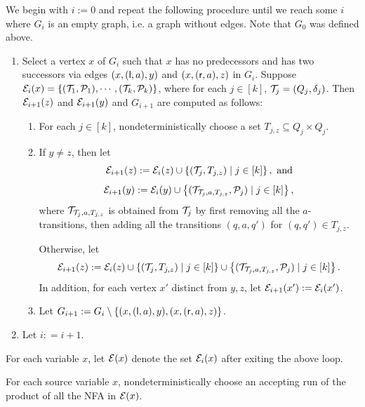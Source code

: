 We begin with $i:= 0$ and repeat the following procedure until we reach some $i$ where $G_i$ is an empty graph, i.e. a graph without edges.
Note that $G_0$ was defined above.
\begin{enumerate}
\item Select a vertex $x$ of $G_i$ such that $x$ has no predecessors  and has two successors via edges $(x, (\mathsf{l}, a), y)$ and $(x, (\mathsf{r},a), z)$ in $G_i$.  Suppose $\mathcal{E}_i(x)=\{(\mathcal{T}_1,\mathcal{P}_1), \cdots, (\mathcal{T}_k, \mathcal{P}_k)\}$, where for each $j \in [k]$, $\mathcal{T}_j = (Q_j, \delta_j)$. Then $\mathcal{E}_{i+1}(z)$ and  $\mathcal{E}_{i+1}(y)$ and $G_{i+1}$ are computed as follows:
\begin{enumerate}
\item For each $j \in [k]$, nondeterministically choose a set $T_{j, z} \subseteq Q_j \times Q_j$.
%
\item If $y \neq z$, then let
$$\mathcal{E}_{i+1}(z):= \mathcal{E}_{i}(z) \cup \left\{(\mathcal{T}_j, T_{j,z}) \mid j \in [k] \right\}, \text{ and}$$
$$\mathcal{E}_{i+1}(y): = \mathcal{E}_{i}(y) \cup \left\{(\mathcal{T}_{\mathcal{T}_j, a, T_{j,z}}, \mathcal{P}_j) \mid j \in [k] \right\},$$
where $\mathcal{T}_{\mathcal{T}_j, a, T_{j,z}}$ is obtained from $\mathcal{T}_j$ by first removing all the $a$-transitions, then adding all the transitions $(q, a, q')$ for $(q,q') \in T_{j,z}$.

Otherwise, let
$$\mathcal{E}_{i+1}(z):= \mathcal{E}_{i}(z) \cup \left\{(\mathcal{T}_j, T_{j,z}) \mid j \in [k] \right\} \cup \left\{(\mathcal{T}_{\mathcal{T}_j, a, T_{j,z}}, \mathcal{P}_j) \mid j \in [k] \right\}.$$
In addition, for each vertex $x'$ distinct from $y, z$, let $\mathcal{E}_{i+1}(x') := \mathcal{E}_i(x')$.
%
\item Let $G_{i+1}:= G_i \setminus \{(x, (\mathsf{l}, a), y), (x, (\mathsf{r},a), z)\}$.
\end{enumerate}
%
\item Let $i: = i+1$.
\end{enumerate}

For each variable $x$, let $\mathcal{E}(x)$ denote the set $\mathcal{E}_i(x)$ after exiting the above loop.

\smallskip

For each source variable $x$, nondeterministically choose an accepting run of the product of all the NFA in $\mathcal{E}(x)$.

\smallskip


